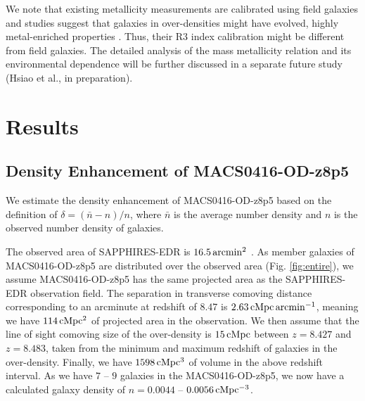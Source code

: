 \documentclass[twocolumn]{aastex631}
\begin{document}
We note that existing metallicity measurements are calibrated using field galaxies and studies suggest that galaxies in over-densities might have evolved, highly metal-enriched properties \citep{Champagne2024a}. Thus, their R3 index calibration might be different from field galaxies. 
The detailed analysis of the mass metallicity relation and its environmental dependence will be further discussed in a separate future study (Hsiao et al., in preparation).



\section{Results} \label{sec:results}


\subsection{Density Enhancement of MACS0416-OD-z8p5}

We estimate the density enhancement of MACS0416-OD-z8p5 based on the definition of $\delta = ({\bar n} - n) / n$, where ${\bar n}$ is the average number density and $n$ is the observed number density of galaxies.

The observed area of SAPPHIRES-EDR is $16.5\,{\rm arcmin^2}$ \citep{Sun2025}. As member galaxies of MACS0416-OD-z8p5 are distributed over the observed area (Fig. \ref{fig:entire}), we assume MACS0416-OD-z8p5 has the same projected area as the SAPPHIRES-EDR observation field.
The separation in transverse comoving distance corresponding to an arcminute at redshift of $8.47$ is $2.63\,{\rm cMpc\,arcmin^{-1}}$, meaning we have $114\,{\rm cMpc^{2}}$ of projected area in the observation.
We then assume that the line of sight comoving size of the over-density is $15\,{\rm cMpc}$ between $z=8.427$ and $z=8.483$, taken from the minimum and maximum redshift of galaxies in the over-density. Finally, we have $1598\,{\rm cMpc^3}$ of volume in the above redshift interval. As we have $7$ -- $9$ galaxies in the MACS0416-OD-z8p5, we now have a calculated galaxy density of $n = 0.0044$ -- $0.0056\,{\rm cMpc^{-3}}$.
\end{document}
